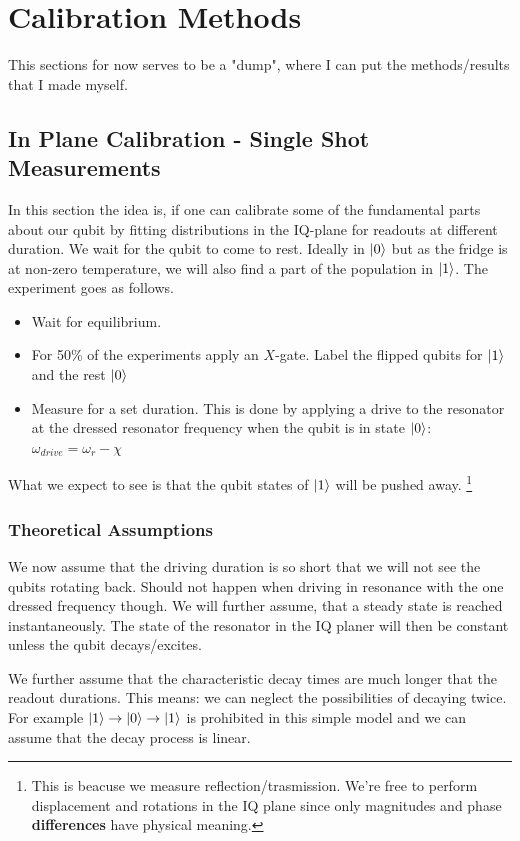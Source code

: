 \chapter{Calibration Methods}
This sections for now serves to be a "dump", where I can put the methods/results that I made myself. 



\section{In Plane Calibration - Single Shot Measurements}
In this section the idea is, if one can calibrate some of the fundamental parts about our qubit by fitting distributions in the IQ-plane for readouts at different duration. We wait for the qubit to come to rest. Ideally in $\ket{0}$ but as the fridge is at non-zero temperature, we will also find a part of the population in $\ket{1}$. The experiment goes as follows.
\begin{itemize}
    \item Wait for equilibrium.
    \item For 50\% of the experiments apply an $X$-gate. Label the flipped qubits for $\ket{1}$ and the rest $\ket{0}$
    \item Measure for a set duration. This is done by applying a drive to the resonator at the dressed resonator frequency when the qubit is in state $\ket{0}$: $\omega_{drive} = \omega_r - \chi$
\end{itemize}
What we expect to see is that the qubit states of $\ket{1}$ will be pushed away. \footnote{This is beacuse we measure reflection/trasmission. We're free to perform displacement and rotations in the IQ plane since only magnitudes and phase \textbf{differences} have physical meaning.} 

\subsection{Theoretical Assumptions}
We now assume that the driving duration is so short that we will not see the qubits rotating back. Should not happen when driving in resonance with the one dressed frequency though. We will further assume, that a steady state is reached instantaneously. The state of the resonator in the IQ planer will then be constant unless the qubit decays/excites. 

We further assume that the characteristic decay times are much longer that the readout durations. This means: we can neglect the possibilities of decaying twice. For example $\ket{1} \to \ket{0} \to \ket{1}$ is prohibited in this simple model and we can assume that the decay process is linear.

